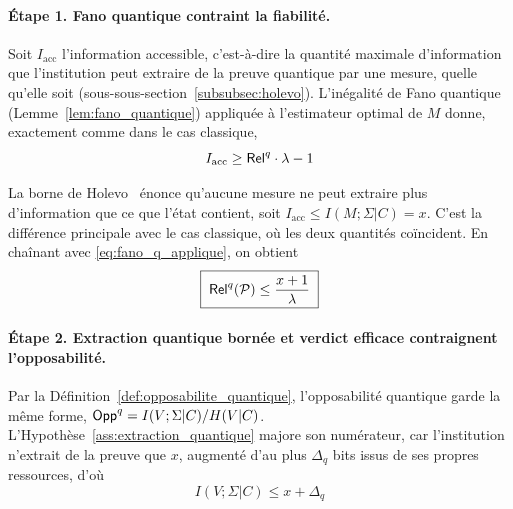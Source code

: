 \begin{sloppypar}
\begin{Preuve}
\paragraph{\'Etape 1. Fano quantique contraint la fiabilit\'e.}
Soit $I_{\mathrm{acc}}$ l'information accessible, c'est-\`a-dire la
quantit\'e maximale d'information que l'institution peut extraire de la
preuve quantique par une mesure, quelle qu'elle soit
(sous-sous-section~\ref{subsubsec:holevo}). L'in\'egalit\'e de Fano
quantique (Lemme~\ref{lem:fano_quantique}) appliqu\'ee \`a l'estimateur
optimal de $M$ donne, exactement comme dans le cas classique,
\begin{equation}
I_{\mathrm{acc}} \geq \mathsf{Rel}^q \cdot \lambda - 1
\label{eq:fano_q_applique}
\end{equation}

La borne de Holevo~\cite{Holevo1973} \'enonce qu'aucune mesure ne peut
extraire plus d'information que ce que l'\'etat contient, soit
$I_{\mathrm{acc}} \leq I(M;\Sigma|C) = x$. C'est la diff\'erence
principale avec le cas classique, o\`u les deux quantit\'es co\"incident.
En cha\^inant avec \eqref{eq:fano_q_applique}, on obtient
\begin{equation}
\boxed{\;\mathsf{Rel}^q(\mathcal{P}) \leq \frac{x+1}{\lambda}\;}
\label{eq:relq_bound}
\end{equation}

\paragraph{\'Etape 2. Extraction quantique born\'ee et verdict efficace contraignent l'opposabilit\'e.}
Par la D\'efinition~\ref{def:opposabilite_quantique}, l'opposabilit\'e
quantique garde la m\^eme forme, $\mathsf{Opp}^q = I(V;\Sigma|C)/H(V|C)$.
L'Hypoth\`ese~\ref{ass:extraction_quantique} majore son num\'erateur, car
l'institution n'extrait de la preuve que $x$, augment\'e d'au plus
$\Delta_q$ bits issus de ses propres ressources, d'o\`u
\begin{equation}
I(V;\Sigma|C) \leq x + \Delta_q
\end{equation}


\end{Preuve}
\end{sloppypar}
